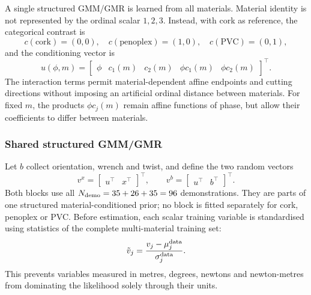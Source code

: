 \documentclass[11pt,a4paper]{article}
\begin{document}
A single structured GMM/GMR is learned from all materials. Material identity is
not represented by the ordinal scalar $1,2,3$. Instead, with cork as reference,
the categorical contrast is
\[
c(\mathrm{cork})=(0,0),\quad
c(\mathrm{penoplex})=(1,0),\quad
c(\mathrm{PVC})=(0,1),
\]
and the conditioning vector is
\begin{equation}
u(\phi,m)=
\begin{bmatrix}\phi&c_1(m)&c_2(m)&\phi c_1(m)&\phi c_2(m)\end{bmatrix}^{\!\top}.
\label{eq:material_condition}
\end{equation}
The interaction terms permit material-dependent affine endpoints and cutting
directions without imposing an artificial ordinal distance between materials.
For fixed $m$, the products $\phi c_j(m)$ remain affine functions of phase,
but allow their coefficients to differ between materials.

\subsubsection{Shared structured GMM/GMR}
Let $b$ collect orientation, wrench and twist, and define the two random vectors
\begin{equation}
v^{x}=\begin{bmatrix}u^\top&x^\top\end{bmatrix}^{\!\top},
\qquad
v^{b}=\begin{bmatrix}u^\top&b^\top\end{bmatrix}^{\!\top}.
\label{eq:gmr_blocks}
\end{equation}
Both blocks use all $N_{\rm demo}=35+26+35=96$ demonstrations. They are parts
of one structured material-conditioned prior; no block is fitted separately
for cork, penoplex or PVC. Before estimation, each scalar training variable is
standardised using statistics of the complete multi-material training set:
\begin{equation}
\tilde v_j=\frac{v_j-\mu_j^{\rm data}}{\sigma_j^{\rm data}}.
\label{eq:gmr_standardisation}
\end{equation}
This prevents variables measured in metres, degrees, newtons and
newton-metres from dominating the likelihood solely through their units.
\end{document}

